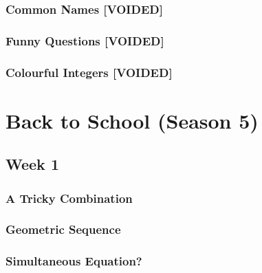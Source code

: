 \documentclass[titlepage=true]{scrartcl}
\begin{document}
        \subsubsection{Common Names \textbf[VOIDED]}
            \label{4-1-3}
            
        \newpage 
        
        \subsubsection{Funny Questions \textbf[VOIDED]}
            \label{4-1-4}
            
        \newpage 
    
        \subsubsection{Colourful Integers \textbf[VOIDED]}
            \label{4-1-5}
            
        \newpage 

\section{Back to School (Season 5) }
            
    \subsection{Week 1}
    
        \subsubsection{A Tricky Combination}
            \label{5-1-1}
            
        \newpage 

        \subsubsection{Geometric Sequence}
            \label{5-1-2}
            
        \newpage 

        \subsubsection{Simultaneous Equation?}
            \label{5-1-3}
            
        \newpage
\end{document}
